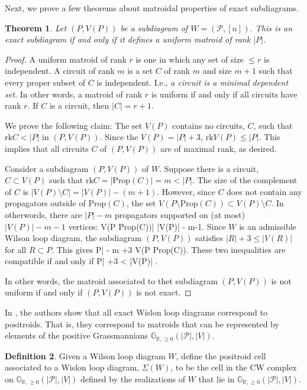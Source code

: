 \documentclass[11pt]{article}
\newcommand{\R}{\mathbb{R}}
\newcommand{\Gr}{\mathbb{G}_{\R, \geq 0}}
\newcommand{\rk}{\textrm{rk}}
\def\bas #1\eas{\begin{align*} #1 \end{align*}}
\newcommand{\cP}{\mathcal{P}}
\newcommand{\Prop}{\textrm{Prop}}
\newtheorem{thm}{Theorem}[section]
\theoremstyle{remark}
\theoremstyle{definition}
\newtheorem{dfn}[thm]{Definition}
\begin{document}
Next, we prove a few theorems about matroidal properties of exact subdiagrams.

\begin{thm} \label{exactcircuitlem}
Let $(P, V(P))$ be a subdiagram of $W= (\cP, [n])$. This is an exact subdiagram if and only if it defines a uniform matroid of rank $|P|$.
\end{thm}

\begin{proof}
A uniform matroid of rank $r$ is one in which any set of size $ \leq r$ is independent. A circuit of rank $m$ is a set $C$ of rank $m$ and size $m+1$ such that every proper subset of $C$ is independent. I.e., \emph{a circuit is a minimal dependent set.} In other words, a matroid of rank $r$ is uniform if and only if all circuits have rank $r$. If $C$ is a circuit, then $|C| = r+1$.

We prove the following claim: The set $V(P)$ contains no circuits, $C$, such that  $\rk C< |P|$ in $(P, V(P))$. Since the $V(P) = |P|+3$, $\rk V(P) \leq |P|$. This implies that all circuits $C$ of $(P, V(P))$ are of maximal rank, as desired.

Consider a subdiagram $(P, V(P))$ of $W$. Suppose there is a circuit, $C \subset V(P)$ such that $\rk C = |\Prop (C) | = m < |P|$. The size of the complement of $C$ is $|V(P) \setminus C| = |V(P)| -(m+1)$. However, since $C$ does not contain any propagators outside of $\Prop (C)$, the set $V(P \setminus \Prop(C)) \subset V(P )\setminus C$. In otherwords, there are $|P| - m$ propagators supported on (at most) $|V(P)|-m -1$ vertices: \bas |V(P \setminus \Prop (C))| \leq |V(P)| - m-1\;. \eas Since $W$ is an admissible Wilson loop diagram, the subdiagram $(P, V(P))$ satisfies $|R| +3 \leq |V(R)|$ for all $R \subset P$.  This gives \bas |P| - m +3 \leq V(P \setminus \Prop(C))\;. \eas These two inequalities are compatible if and only if \bas |P| +3 < |V(P)| \;. \eas

In other words, the matroid associated to thet subdiagram $(P, V(P))$ is not uniform if and only if $(P, V(P))$ is not exact.
\end{proof}

In \cite{wilsonloops}, the authors show that all exact Wislon loop diagrams correspond to positroids. That is, they correspond to matroids that can be represented by elements of the positive Grassmannians $\Gr(|\cP|, |V|)$.

\begin{dfn}
Given a Wilson loop diagram $W$, define the positroid cell associated to a Wislon loop diagram, $\Sigma(W)$, to be the cell in the CW complex on $\Gr(|\cP|, |V|)$ defined by the realizations of $W$ that lie in $\Gr(|\cP|, |V|)$.
\end{dfn}
\end{document}
